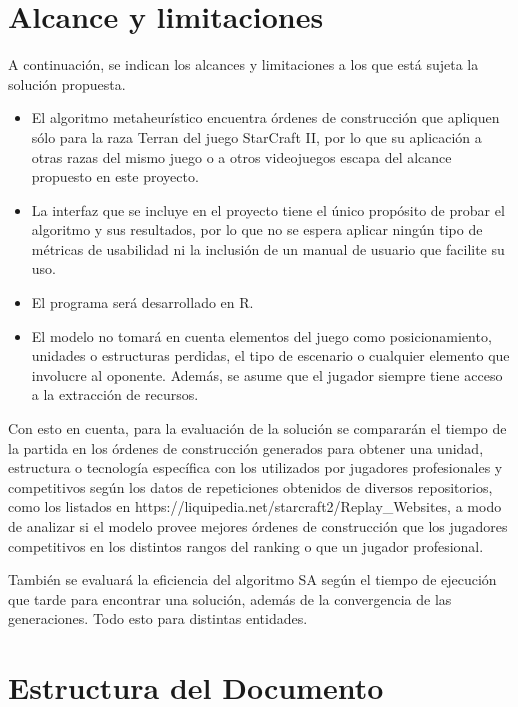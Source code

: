 \section{Alcance y limitaciones}

A continuación, se indican los alcances y limitaciones a los que está sujeta la solución propuesta.

\begin{itemize}
 \item El algoritmo metaheurístico encuentra órdenes de construcción que apliquen sólo para la raza Terran del juego StarCraft II, por lo que su aplicación a otras razas del mismo juego o a otros videojuegos escapa del alcance propuesto en este proyecto.

 \item La interfaz que se incluye en el proyecto tiene el único propósito de probar el algoritmo y sus resultados, por lo que no se espera aplicar ningún tipo de métricas de usabilidad ni la inclusión de un manual de usuario que facilite su uso.

 \item El programa será desarrollado en R.

 \item El modelo no tomará en cuenta elementos del juego como posicionamiento, unidades o estructuras perdidas, el tipo de escenario o cualquier elemento que involucre al oponente. Además, se asume que el jugador siempre tiene acceso a la extracción de recursos.
\end{itemize}

Con esto en cuenta, para la evaluación de la solución se compararán el tiempo de la partida en los órdenes de construcción generados para obtener una unidad, estructura o tecnología específica con los utilizados por jugadores profesionales y competitivos según los datos de repeticiones obtenidos de diversos repositorios, como los listados en https://liquipedia.net/starcraft2/Replay\_Websites, a modo de analizar si el modelo provee mejores órdenes de construcción que los jugadores competitivos en los distintos rangos del ranking o que un jugador profesional.

También se evaluará la eficiencia del algoritmo SA según el tiempo de ejecución que tarde para encontrar una solución, además de la convergencia de las generaciones. Todo esto para distintas entidades.


\section{Estructura del Documento}

